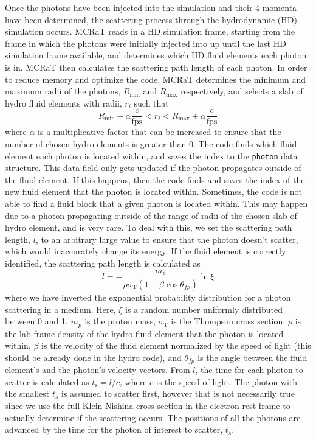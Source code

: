 \documentclass[12pt,a4paper]{article}
\begin{document}
Once the photons have been injected into the simulation and their 4-momenta have been determined, the scattering process through the hydrodynamic (HD) simulation occurs. MCRaT reads in a HD simulation frame, starting from the frame in which the photons were initially injected into up until the last HD simulation frame available, and determines which HD fluid elements each photon is in. MCRaT then calculates the scattering path length of each photon. In order to reduce memory and optimize the code, MCRaT determines the minimum and maximum radii of the photons, $R_\mathrm{min}$ and $R_\mathrm{max}$ respectively, and selects a slab of hydro fluid elements with radii, $r_i$ such that 
\[
R_\mathrm{min}-\alpha\frac{c}{\mathrm{fps}} < r_i < R_\mathrm{max}+\alpha\frac{c}{\mathrm{fps}} 
\] 
where $\alpha$ is a multiplicative factor that can be increased to ensure that the number of chosen hydro elements is greater than 0. The code finds which fluid element each photon is located within, and saves the index to the \texttt{photon} data structure. This data field only gets updated if the photon propagates outside of the fluid element. If this happens, then the code finds and saves the index of the new fluid element that the photon is located within. Sometimes, the code is not able to find a fluid block that a given photon is located within. This may happen due to a photon propagating outside of the range of radii of the chosen slab of hydro element, and is very rare. To deal with this, we set the scattering path length, $l$, to an arbitrary large value to ensure that the photon doesn't scatter, which would inaccurately change its energy. If the fluid element is correctly identified, the scattering path length is calculated as  
\[
l=-\frac{m_p}{\rho\sigma_\mathrm{T}(1-\beta\cos\theta_{fp})}\ln\xi
\]
where we have inverted the exponential probability distribution for a photon scattering in a medium. Here, $\xi$ is a random number uniformly distributed between 0 and 1, $m_p$ is the proton mass, $\sigma_\mathrm{T}$ is the Thompson cross section, $\rho$ is the lab frame density of the hydro fluid element that the photon is located within, $\beta$ is the velocity of the fluid element normalized by the speed of light (this should be already done in the hydro code), and $\theta_{fp}$ is the angle between the fluid element's and the photon's velocity vectors. From $l$, the time for each photon to scatter is calculated as $t_\mathrm{s}=l/c$, where $c$ is the speed of light. The photon with the smallest $t_s$ is assumed to scatter first, however that is not necessarily true since we use the full Klein-Nishina cross section in the electron rest frame to actually determine if the scattering occurs. The positions of all the photons are advanced by the time for the photon of interest to scatter, $t_s$.
\end{document}
